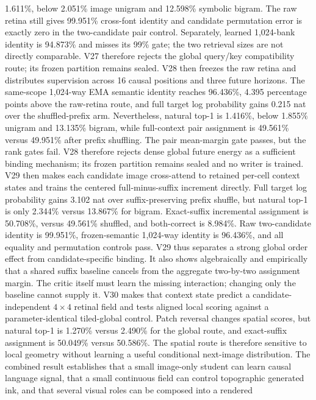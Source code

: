 \documentclass[11pt]{article}
\begin{document}
1.611\%, below 2.051\% image unigram and 12.598\% symbolic bigram. The raw
retina still gives 99.951\% cross-font identity and candidate permutation error
is exactly zero in the two-candidate pair control. Separately, learned
1,024-bank identity is 94.873\% and misses its 99\% gate; the two retrieval
sizes are not directly comparable. V27 therefore rejects the global query/key
compatibility route; its frozen partition remains sealed.
V28 then freezes the raw retina and distributes supervision across 16 causal
positions and three future horizons. The same-scope 1,024-way EMA semantic
identity reaches 96.436\%, 4.395 percentage points above the raw-retina route,
and full target log probability gains 0.215 nat over the shuffled-prefix arm.
Nevertheless, natural top-1 is 1.416\%, below 1.855\% unigram and 13.135\%
bigram, while full-context pair assignment is 49.561\% versus 49.951\% after
prefix shuffling. The pair mean-margin gate passes, but the rank gates fail.
V28 therefore rejects dense global future energy as a sufficient binding
mechanism; its frozen partition remains sealed and no writer is trained.
V29 then makes each candidate image cross-attend to retained per-cell context
states and trains the centered full-minus-suffix increment directly. Full
target log probability gains 3.102 nat over suffix-preserving prefix shuffle,
but natural top-1 is only 2.344\% versus 13.867\% for bigram. Exact-suffix
incremental assignment is 50.708\%, versus 49.561\% shuffled, and both-correct
is 8.984\%. Raw two-candidate identity is 99.951\%, frozen-semantic 1,024-way
identity is 96.436\%, and all equality and permutation controls pass. V29 thus
separates a strong global order effect from candidate-specific binding. It also
shows algebraically and empirically that a shared suffix baseline cancels from
the aggregate two-by-two assignment margin. The critic itself must learn the
missing interaction; changing only the baseline cannot supply it.
V30 makes that context state predict a candidate-independent $4\times4$ retinal
field and tests aligned local scoring against a parameter-identical tiled-global
control. Patch reversal changes spatial scores, but natural top-1 is 1.270\%
versus 2.490\% for the global route, and exact-suffix assignment is 50.049\%
versus 50.586\%. The spatial route is therefore sensitive to local geometry
without learning a useful conditional next-image distribution.
The combined result establishes that a small image-only student can learn
causal language signal, that a small continuous field can control topographic
generated ink, and that several visual roles can be composed into a rendered
\end{document}
